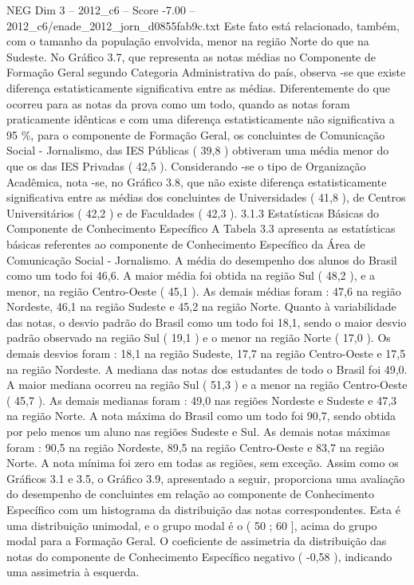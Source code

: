 \begin{textsample}{NEG Dim 3 – 2012\_c6 – Score -7.00 – 2012\_c6/enade\_2012\_jorn\_d0855fab9c.txt}
Este fato está relacionado, também, com o tamanho da população envolvida, menor na região Norte do que na Sudeste.
No Gráfico 3.7, que representa as notas médias no Componente de Formação Geral segundo Categoria Administrativa do país, observa -se que existe diferença estatisticamente significativa entre as médias.
Diferentemente do que ocorreu para as notas da prova como um todo, quando as notas foram praticamente idênticas e com uma diferença estatisticamente não significativa a 95 \%, para o componente de Formação Geral, os concluintes de Comunicação Social - Jornalismo, das IES Públicas ( 39,8 ) obtiveram uma média menor do que os das IES Privadas ( 42,5 ).
Considerando -se o tipo de Organização Acadêmica, nota -se, no Gráfico 3.8, que não existe diferença estatisticamente significativa entre as médias dos concluintes de Universidades ( 41,8 ), de Centros Universitários ( 42,2 ) e de Faculdades ( 42,3 ). 3.1.3 Estatísticas Básicas do Componente de Conhecimento Específico A Tabela 3.3 apresenta as estatísticas básicas referentes ao componente de Conhecimento Específico da Área de Comunicação Social - Jornalismo.
A média do desempenho dos alunos do Brasil como um todo foi 46,6.
A maior média foi obtida na região Sul ( 48,2 ), e a menor, na região Centro-Oeste ( 45,1 ).
As demais médias foram : 47,6 na região Nordeste, 46,1 na região Sudeste e 45,2 na região Norte.
Quanto à variabilidade das notas, o desvio padrão do Brasil como um todo foi 18,1, sendo o maior desvio padrão observado na região Sul ( 19,1 ) e o menor na região Norte ( 17,0 ).
Os demais desvios foram : 18,1 na região Sudeste, 17,7 na região Centro-Oeste e 17,5 na região Nordeste.
A mediana das notas dos estudantes de todo o Brasil foi 49,0.
A maior mediana ocorreu na região Sul ( 51,3 ) e a menor na região Centro-Oeste ( 45,7 ).
As demais medianas foram : 49,0 nas regiões Nordeste e Sudeste e 47,3 na região Norte.
A nota máxima do Brasil como um todo foi 90,7, sendo obtida por pelo menos um aluno nas regiões Sudeste e Sul.
As demais notas máximas foram : 90,5 na região Nordeste, 89,5 na região Centro-Oeste e 83,7 na região Norte.
A nota mínima foi zero em todas as regiões, sem exceção.
Assim como os Gráficos 3.1 e 3.5, o Gráfico 3.9, apresentado a seguir, proporciona uma avaliação do desempenho de concluintes em relação ao componente de Conhecimento Específico com um histograma da distribuição das notas correspondentes.
Esta é uma distribuição unimodal, e o grupo modal é o ( 50 ; 60 ], acima do grupo modal para a Formação Geral.
O coeficiente de assimetria da distribuição das notas do componente de Conhecimento Específico negativo ( -0,58 ), indicando uma assimetria à esquerda.

\end{textsample}
